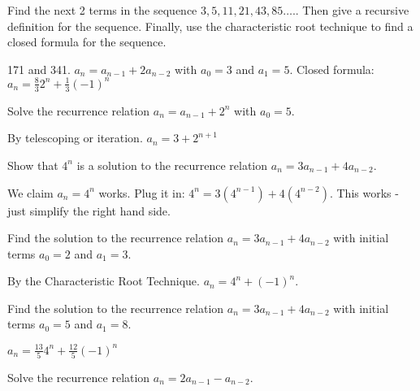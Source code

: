\begin{questions}
	
	


\question Find the next 2 terms in the sequence $3, 5, 11, 21, 43, 85\ldots.$.  Then give a recursive definition for the sequence.  Finally, use the characteristic root technique to find a closed formula for the sequence.

	\begin{answer}
		171 and 341.  $a_n = a_{n-1} + 2a_{n-2}$ with $a_0 = 3$ and $a_1 = 5$.  Closed formula: $a_n = \frac{8}{3}2^n + \frac{1}{3}(-1)^n$
	\end{answer}
	
	
	


\question Solve the recurrence relation $a_n = a_{n-1} + 2^n$ with $a_0 = 5$.

	\begin{answer}
		By telescoping or iteration.  $a_n = 3 + 2^{n+1}$
	\end{answer}
	
	
	


\question Show that $4^n$ is a solution to the recurrence relation $a_n = 3a_{n-1} + 4a_{n-2}$.

	\begin{answer}
		We claim $a_n = 4^n$ works.  Plug it in: $4^n = 3(4^{n-1}) + 4(4^{n-2})$.  This works - just simplify the right hand side.
	\end{answer}
	
	
	


\question Find the solution to the recurrence relation $a_n = 3a_{n-1} + 4a_{n-2}$ with initial terms $a_0 = 2$ and $a_1 = 3$.

	\begin{answer}
		By the Characteristic Root Technique.  $a_n = 4^n + (-1)^n$.
	\end{answer}
	
	
	


\question Find the solution to the recurrence relation $a_n = 3a_{n-1} + 4a_{n-2}$ with initial terms $a_0 = 5$ and $a_1 = 8$.

	\begin{answer}
		$a_n = \frac{13}{5} 4^n + \frac{12}{5} (-1)^n$
	\end{answer}
	
	
	


\question Solve the recurrence relation $a_n = 2a_{n-1} - a_{n-2}$.
\begin{parts}

\end{parts}
\end{questions}
